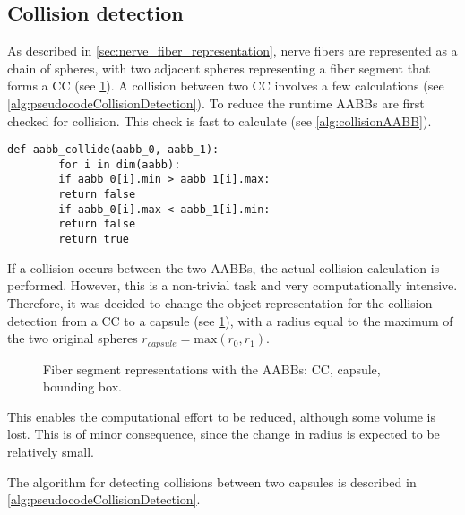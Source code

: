 \subsection{Collision detection}
\label{sec:collisionDetection}
% 
As described in \cref{sec:nerve_fiber_representation}, nerve fibers are represented as a chain of spheres, with two adjacent spheres representing a fiber segment that forms a \ac{CC} (see \cref{fig:conical_capsule}).
A collision between two \ac{CC} involves a few calculations (see \cref{alg:pseudocodeCollisionDetection}).
To reduce the runtime \acp{AABB} are first checked for collision.
This check is fast to calculate (see \cref{alg:collisionAABB}).
\begin{lstfloat}[!tb]
    \lstset{style=python}
    \begin{lstlisting}[]
        def aabb_collide(aabb_0, aabb_1):
        for i in dim(aabb):
        if aabb_0[i].min > aabb_1[i].max:
        return false
        if aabb_0[i].max < aabb_1[i].min:
        return false
        return true
    \end{lstlisting}
    \caption{Calculation if a collision between \acp{AABB} exists.}
    \label{alg:collisionAABB}
\end{lstfloat}
% 
% 
If a collision occurs between the two \acp{AABB}, the actual collision calculation is performed.
However, this is a non-trivial task and very computationally intensive.
Therefore, it was decided to change the object representation for the collision detection from a \ac{CC} to a capsule (see \cref{fig:conical_capsule}), with a radius equal to the maximum of the two original spheres $r_{\mathit{capsule}} = \mathrm{max}(r_0, r_1)$.
%
\begin{figure}[!t]
    \centering
    \setlength{\tikzwidth}{0.6\textwidth}
    \tikzset{external/export=false}
    \caption[]{Fiber segment representations with the \acp{AABB}: \raisebox{.25em}{\tikz \draw[black](0,0)--(0.275,0);} \ac{CC}, \raisebox{.25em}{\tikz \draw[blue, dash pattern=on 2.5pt off 2.5pt](0,0)--(0.275,0);} capsule, \raisebox{.25em}{\tikz \draw[red, dash pattern={on 2.5pt off 0.9pt on 0.42pt off 0.9pt}](0,0)--(0.275,0);} bounding box.}
    \label{fig:conical_capsule}
\end{figure}
% 
This enables the computational effort to be reduced, although some volume is lost.
This is of minor consequence, since the change in radius is expected to be relatively small.
\par
% 
The algorithm for detecting collisions between two capsules is described in \cref{alg:pseudocodeCollisionDetection}.
